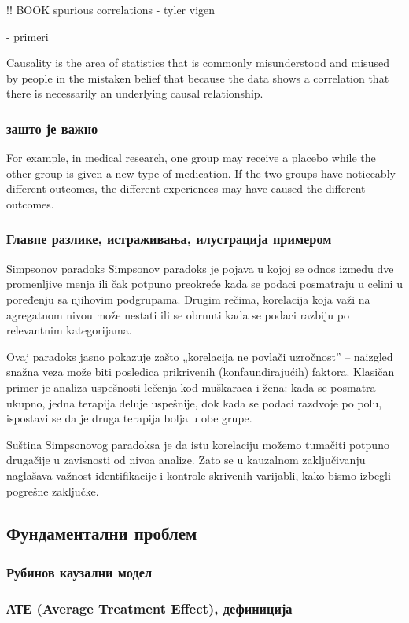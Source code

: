 \documentclass[12pt, a4paper]{article}
\begin{document}
!! BOOK spurious correlations - tyler vigen

- primeri 
 

Causality is the area of statistics that is commonly misunderstood and misused by people in the mistaken belief that 
because the data shows a correlation that there is necessarily an underlying causal relationship. 

   \subsubsection{зашто је важно}
    For example, in medical research, one group may receive a placebo while the other group is given a new type of medication. 
    If the two groups have noticeably different outcomes, the different experiences may have caused the different outcomes.
    \subsubsection{Главне разлике, истраживања, илустрација примером}
    Simpsonov paradoks
    Simpsonov paradoks je pojava u kojoj se odnos između dve promenljive menja ili čak potpuno preokreće kada se podaci 
    posmatraju u celini u poređenju sa njihovim podgrupama. Drugim rečima, korelacija koja važi na agregatnom nivou može 
    nestati ili se obrnuti kada se podaci razbiju po relevantnim kategorijama.

Ovaj paradoks jasno pokazuje zašto „korelacija ne povlači uzročnost” – naizgled snažna veza može biti posledica prikrivenih 
(konfaundirajućih) faktora. Klasičan primer je analiza uspešnosti lečenja kod muškaraca i žena: kada se posmatra ukupno, 
jedna terapija deluje uspešnije, dok kada se podaci razdvoje po polu, ispostavi se da je druga terapija bolja u obe grupe.

Suština Simpsonovog paradoksa je da istu korelaciju možemo tumačiti potpuno drugačije u zavisnosti od nivoa analize. 
Zato se u kauzalnom zaključivanju naglašava važnost identifikacije i kontrole skrivenih varijabli, kako bismo izbegli 
pogrešne zaključke.


\subsection{Фундаментални проблем}
    \subsubsection{Рубинов каузални модел}
    \subsubsection{АТЕ (Average Treatment Effect), дефиниција}
\end{document}
